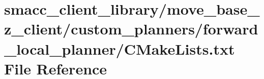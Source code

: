 \hypertarget{client__library_2move__base__z__client_2custom__planners_2forward__local__planner_2CMakeLists_8txt}{}\section{smacc\+\_\+client\+\_\+library/move\+\_\+base\+\_\+z\+\_\+client/custom\+\_\+planners/forward\+\_\+local\+\_\+planner/\+C\+Make\+Lists.txt File Reference}
\label{client__library_2move__base__z__client_2custom__planners_2forward__local__planner_2CMakeLists_8txt}
